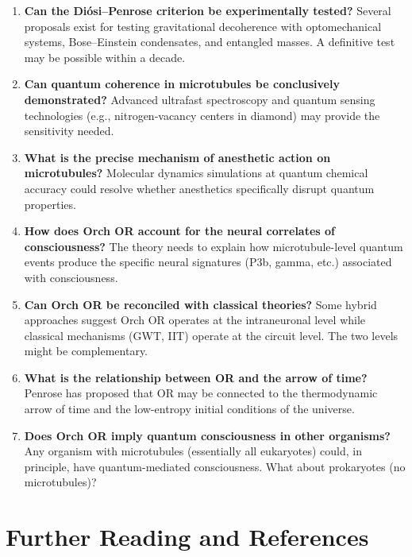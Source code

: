 \documentclass[11pt,a4paper]{report}
\begin{document}
\begin{enumerate}[leftmargin=2em]
  \item \textbf{Can the Di\'osi--Penrose criterion be experimentally tested?} Several proposals exist for testing gravitational decoherence with optomechanical systems, Bose--Einstein condensates, and entangled masses. A definitive test may be possible within a decade.
  \item \textbf{Can quantum coherence in microtubules be conclusively demonstrated?} Advanced ultrafast spectroscopy and quantum sensing technologies (e.g., nitrogen-vacancy centers in diamond) may provide the sensitivity needed.
  \item \textbf{What is the precise mechanism of anesthetic action on microtubules?} Molecular dynamics simulations at quantum chemical accuracy could resolve whether anesthetics specifically disrupt quantum properties.
  \item \textbf{How does Orch OR account for the neural correlates of consciousness?} The theory needs to explain how microtubule-level quantum events produce the specific neural signatures (P3b, gamma, etc.) associated with consciousness.
  \item \textbf{Can Orch OR be reconciled with classical theories?} Some hybrid approaches suggest Orch OR operates at the intraneuronal level while classical mechanisms (GWT, IIT) operate at the circuit level. The two levels might be complementary.
  \item \textbf{What is the relationship between OR and the arrow of time?} Penrose has proposed that OR may be connected to the thermodynamic arrow of time and the low-entropy initial conditions of the universe.
  \item \textbf{Does Orch OR imply quantum consciousness in other organisms?} Any organism with microtubules (essentially all eukaryotes) could, in principle, have quantum-mediated consciousness. What about prokaryotes (no microtubules)?
\end{enumerate}


\chapter{Further Reading and References}
\end{document}
